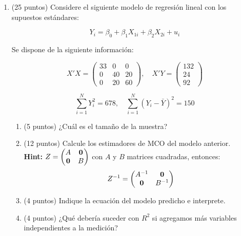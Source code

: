 \documentclass[10pt,a4paper]{article}
\begin{document}
\begin{enumerate}
    
\item (25 puntos) Considere el siguiente modelo de regresión lineal con los supuestos estándares:

    \[
    Y_i = \beta_0 + \beta_1 X_{1i} + \beta_2 X_{2i} + u_i
    \]
    
    Se dispone de la siguiente información:
    
    \[
    X'X = \begin{pmatrix}
    33 & 0 & 0 \\
    0 & 40 & 20 \\
    0 & 20 & 60
    \end{pmatrix}, \quad
    X'Y = \begin{pmatrix}
    132 \\
    24 \\
    92
    \end{pmatrix}
    \]
    
    \[
    \sum_{i=1}^{N} Y_i^2 = 678, \quad \sum_{i=1}^{N} (Y_i - \bar{Y})^2 = 150
    \]

    \begin{enumerate}
        \item (5 puntos) ¿Cuál es el tamaño de la muestra?\\
    
        \item (12 puntos) Calcule los estimadores de MCO del modelo anterior.\\
        \textbf{Hint:} \( Z = \begin{pmatrix} A &{\bf 0} \\ {\bf 0} & B \end{pmatrix} \) con \( A \) y \( B \) matrices cuadradas, entonces:\[Z^{-1} = \begin{pmatrix} A^{-1} & {\bf 0} \\{\bf 0} & B^{-1} \end{pmatrix}\]

        \item (4 puntos) Indique la ecuación del modelo predicho e interprete.

        \item (4 puntos) ¿Qué debería suceder con $R^2$ si agregamos más variables independientes a la medición?
        
    \end{enumerate}



\end{enumerate}
\end{document}
